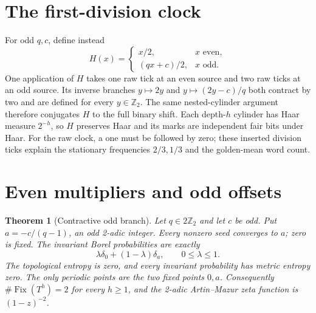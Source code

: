 \documentclass[11pt,letterpaper]{article}
\newcommand{\Z}{\mathbb{Z}}
\newtheorem{theorem}{Theorem}
\begin{document}
\section{The first-division clock}

For odd \(q,c\), define instead
\[
H(x)=\begin{cases}x/2,&x\text{ even},\\(qx+c)/2,&x\text{ odd}.\end{cases}
\]
One application of \(H\) takes one raw tick at an even source and two
raw ticks at an odd source. Its inverse branches
\(y\mapsto2y\) and \(y\mapsto(2y-c)/q\) both contract by two and
are defined for every \(y\in\Z_2\). The same nested-cylinder argument
therefore conjugates \(H\) to the full binary shift. Each depth-\(h\)
cylinder has Haar measure \(2^{-h}\), so \(H\) preserves Haar and
its marks are independent fair bits under Haar. For the raw clock,
a one must be followed by zero; these inserted division ticks explain
the stationary frequencies \(2/3,1/3\) and the golden-mean word count.

\section{Even multipliers and odd offsets}

\begin{theorem}[Contractive odd branch]
\label{thm:even}
Let \(q\in2\Z_2\) and let \(c\) be odd. Put
\(a=-c/(q-1)\), an odd 2-adic integer. Every nonzero seed converges
to \(a\); zero is fixed. The invariant Borel probabilities are exactly
\[
\lambda\delta_0+(1-\lambda)\delta_a,\qquad 0\le\lambda\le1.
\]
The topological entropy is zero, and every invariant probability has
metric entropy zero. The only periodic points are the two fixed points
\(0,a\). Consequently \(\#\operatorname{Fix}(T^h)=2\) for every
\(h\ge1\), and the 2-adic Artin--Mazur zeta function is
\((1-z)^{-2}\).
\end{theorem}
\end{document}
